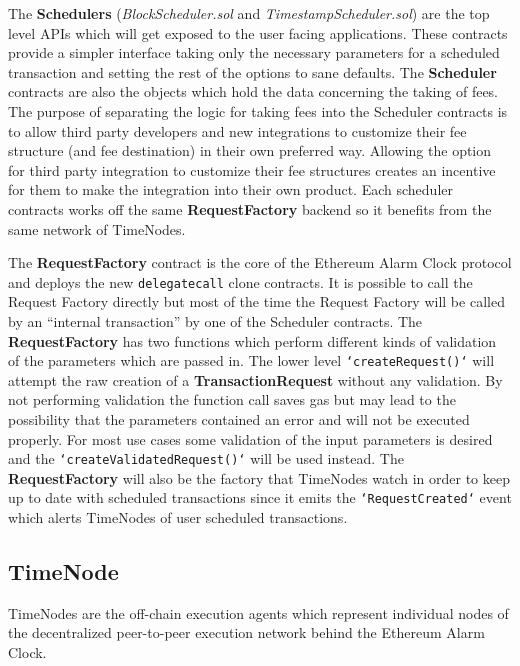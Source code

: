 \documentclass{report}
\begin{document}
  The \textbf{Schedulers} (\textit{BlockScheduler.sol} and \textit{TimestampScheduler.sol}) are the top level APIs which will get exposed to the user facing applications. These contracts provide a simpler interface taking only the necessary parameters for a scheduled transaction and setting the rest of the options to sane defaults. The \textbf{Scheduler} contracts are also the objects which hold the data concerning the taking of fees. The purpose of separating the logic for taking fees into the Scheduler contracts is to allow third party developers and new integrations to customize their fee structure (and fee destination) in their own preferred way. Allowing the option for third party integration to customize their fee structures creates an incentive for them to make the integration into their own product. Each scheduler contracts works off the same \textbf{RequestFactory} backend so it benefits from the same network of TimeNodes.
 
  The \textbf{RequestFactory} contract is the core of the Ethereum Alarm Clock protocol and deploys the new \texttt{delegatecall} clone contracts. It is possible to call the Request Factory directly but most of the time the Request Factory will be called by an “internal transaction” by one of the Scheduler contracts. The \textbf{RequestFactory} has two functions which perform different kinds of validation of the parameters which are passed in. The lower level \texttt{`createRequest()`} will attempt the raw creation of a \textbf{TransactionRequest} without any validation. By not performing validation the function call saves gas but may lead to the possibility that the parameters contained an error and will not be executed properly. For most use cases some validation of the input parameters is desired and the \texttt{`createValidatedRequest()`} will be used instead. The \textbf{RequestFactory} will also be the factory that TimeNodes watch in order to keep up to date with scheduled transactions since it emits the \texttt{`RequestCreated`} event which alerts TimeNodes of user scheduled transactions.
  
  \subsection{TimeNode}
  TimeNodes are the off-chain execution agents which represent individual nodes of the decentralized peer-to-peer execution network behind the Ethereum Alarm Clock.
\end{document}
